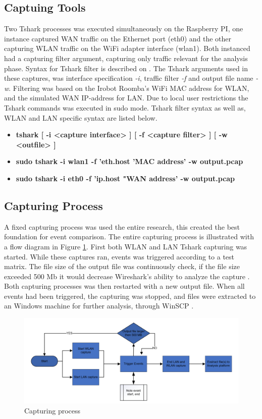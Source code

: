 \subsection{Captuing Tools}
Two Tshark processes was executed simultaneously on the Raspberry PI, one instance captured WAN traffic on the Ethernet port (eth0) and the other capturing WLAN traffic on the WiFi adapter interface (wlan1). Both instanced had a capturing filter argument, capturing only traffic relevant for the analysis phase. Syntax for Tshark filter is described on \cite{tshark_filter}. The Tshark arguments used in these captures, was interface specification \textit{-i}, traffic filter \textit{-f} and output file name \textit{-w}. Filtering was based on the Irobot Roomba's WiFi MAC address for WLAN, and the simulated WAN IP-address for LAN. Due to local user restrictions the Tshark commands was executed in sudo mode. Tshark filter syntax as well as, WLAN and LAN specific syntax are listed below. 

\begin{itemize}
    \item \textbf{tshark [ -i <capture interface> ] [ -f <capture filter> ] [ -w <outfile> ]}
    \item \textbf{sudo tshark -i wlan1 -f 'eth.host 'MAC address' -w output.pcap}
    \item \textbf{sudo tshark -i eth0 -f 'ip.host "WAN address' -w output.pcap}
\end{itemize}

\subsection{Capturing Process}
A fixed capturing process was used the entire research, this created the best foundation for event comparison. The entire capturing process is illustrated with a flow diagram in Figure \ref{fig:captuingprocess}. First both WLAN and LAN Tshark capturing was started. While these captures ran, events was triggered according to a test matrix. The file size of the output file was continuously check, if the file size exceeded 500 Mb it would decrease Wireshark's ability to analyze the capture \cite{wireshark}. Both capturing processes was then restarted with a new output file. When all events had been triggered, the capturing was stopped, and files were extracted to an Windows machine for further analysis, through WinSCP \cite{winscp2023}.
  
\begin{figure}[H]
    \centering
    \includegraphics[width=\textwidth]{figures/Event triggering process.png}
    \caption{Capturing process}
    \label{fig:captuingprocess}
\end{figure}

